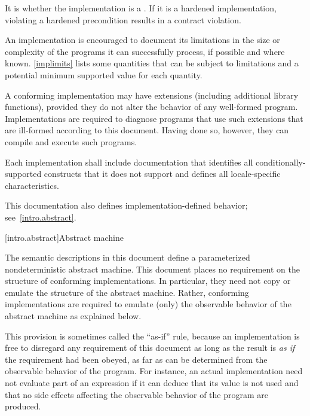 \pnum
It is
whether the implementation is a
.
If it is a hardened implementation,
violating a hardened precondition
results in a contract violation.

\pnum
An implementation is encouraged to document its limitations in
the size or complexity of the programs it can successfully process,
if possible and where known.
\ref{implimits} lists some quantities that can be subject to limitations and
a potential minimum supported value for each quantity.

\pnum
A conforming implementation may have extensions (including
additional library functions), provided they do not alter the
behavior of any well-formed program.
Implementations are required to diagnose programs that use such
extensions that are ill-formed according to this document.
Having done so, however, they can compile and execute such programs.

\pnum
Each implementation shall include documentation that identifies all
conditionally-supported constructs
that it does not support and defines all locale-specific characteristics.
\begin{footnote}
This documentation also defines implementation-defined behavior;
see~\ref{intro.abstract}.
\end{footnote}
%
%

[intro.abstract]{Abstract machine}

\pnum
{}%
%
The semantic descriptions in this document define a
parameterized nondeterministic abstract machine. This document
places no requirement on the structure of conforming
implementations. In particular, they need not copy or emulate the
structure of the abstract machine.
%
%
Rather, conforming implementations are required to emulate (only) the observable
behavior of the abstract machine as explained below.
\begin{footnote}
This provision is
sometimes called the ``as-if'' rule, because an implementation is free to
disregard any requirement of this document as long as the result
is \emph{as if} the requirement had been obeyed, as far as can be determined
from the observable behavior of the program. For instance, an actual
implementation need not evaluate part of an expression if it can deduce that its
value is not used and that no
%
side effects affecting the
observable behavior of the program are produced.
\end{footnote}


